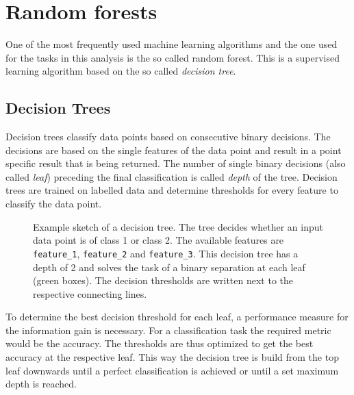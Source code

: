 \section{Random forests}
%
One of the most frequently used machine learning algorithms and the one used
for the tasks in this analysis is the so called random forest. This is a
supervised learning algorithm based on the so called \textit{decision tree}.

\subsection{Decision Trees}
%
Decision trees classify data points based on consecutive binary decisions. The
decisions are based on the single features of the data point and result in a
point specific result that is being returned. The number of single binary
decisions (also called \textit{leaf}) preceding the final classification is
called \textit{depth} of the tree. Decision trees are trained on labelled data
and determine thresholds for every feature to classify the data point.
%
\begin{figure}[H]
  \centering
  \caption{Example sketch of a decision tree. The tree decides whether an input data point is of class 1 or class 2. The available features are \texttt{feature\_1}, \texttt{feature\_2} and \texttt{feature\_3}. This decision tree has a depth of 2 and solves the task of a binary separation at each leaf (green boxes). The decision thresholds are written next to the respective connecting lines.}
  \label{fig:tree}
\end{figure}
%
To determine the best decision threshold for each leaf, a performance measure
for the information gain is necessary. For a classification task the required
metric would be the accuracy. The thresholds are thus optimized to get the best
accuracy at the respective leaf. This way the decision tree is build from the
top leaf downwards until a perfect classification is achieved or until a set
maximum depth is reached.

